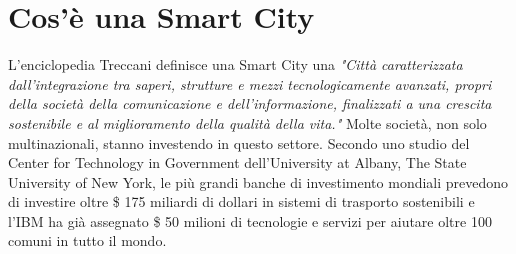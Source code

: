 \chapter{Cos'è una Smart City}
L'enciclopedia Treccani definisce una Smart City una \textit{"Città caratterizzata dall’integrazione tra saperi, strutture e mezzi tecnologicamente avanzati, propri della società della comunicazione e dell’informazione, finalizzati a una crescita sostenibile e al miglioramento della qualità della vita."}\cite{definizione_smart_city}
Molte società, non solo multinazionali, stanno investendo in questo settore. Secondo uno studio del Center for Technology in Government dell'University at Albany, The State University of New York, le più grandi banche di investimento mondiali prevedono di investire oltre \$ 175 miliardi di dollari in sistemi di trasporto sostenibili e l'IBM ha già assegnato \$ 50 milioni  di tecnologie e servizi per aiutare oltre 100 comuni in tutto il mondo.\cite{What_make_city_smart}


\newpage
\newpage
